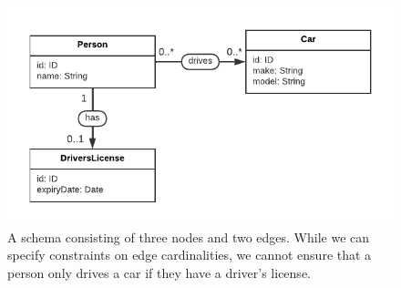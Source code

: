 \documentclass{article}
\theoremstyle{definition}
\newcommand{\otype}{\tau^\mathsf{o}}
\begin{document}
\begin{figure}[t]
  \centering
  \includegraphics{figures/drivers-license.pdf}
  \caption{A schema consisting of three nodes and two edges. While we can specify constraints on edge cardinalities, we cannot ensure that a person only drives a car if they have a driver's license.}
  \label{fig:drivers-license}
\end{figure}




\end{document}
